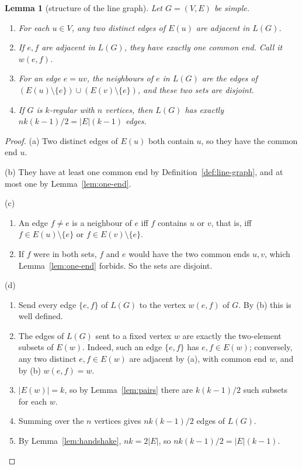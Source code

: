 \documentclass[11pt]{article}
\theoremstyle{plain}
\newtheorem{lemma}[theorem]{Lemma}
\theoremstyle{definition}
\theoremstyle{remark}
\newcommand{\LG}{L(G)}
\newcommand{\st}[1]{E(#1)}
\newenvironment{steps}{\begin{enumerate}[label=(\arabic*),leftmargin=2.2em,itemsep=0.35em]}{\end{enumerate}}
\begin{document}
\begin{lemma}[structure of the line graph]\label{lem:line-graph}
Let $G=(V,E)$ be simple.
\begin{enumerate}[label=(\alph*)]
  \item For each $u\in V$, any two distinct edges of $\st{u}$ are adjacent in $\LG$.
  \item If $e,f$ are adjacent in $\LG$, they have exactly one common end. Call it $w(e,f)$.
  \item For an edge $e=uv$, the neighbours of $e$ in $\LG$ are the edges of
    $(\st{u}\setminus\{e\})\cup(\st{v}\setminus\{e\})$, and these two sets are disjoint.
  \item If $G$ is $k$-regular with $n$ vertices, then $\LG$ has exactly $nk(k-1)/2=|E|(k-1)$
    edges.
\end{enumerate}
\end{lemma}

\begin{proof}
(a) Two distinct edges of $\st{u}$ both contain $u$, so they have the common end $u$.

(b) They have at least one common end by Definition~\ref{def:line-graph}, and at most one by
Lemma~\ref{lem:one-end}.

(c) \begin{steps}
  \item An edge $f\ne e$ is a neighbour of $e$ iff $f$ contains $u$ or $v$, that is, iff
    $f\in\st{u}\setminus\{e\}$ or $f\in\st{v}\setminus\{e\}$.
  \item If $f$ were in both sets, $f$ and $e$ would have the two common ends $u,v$, which
    Lemma~\ref{lem:one-end} forbids. So the sets are disjoint.
\end{steps}

(d) \begin{steps}
  \item Send every edge $\{e,f\}$ of $\LG$ to the vertex $w(e,f)$ of $G$. By (b) this is
    well defined.
  \item The edges of $\LG$ sent to a fixed vertex $w$ are exactly the two-element subsets of
    $\st{w}$. Indeed, such an edge $\{e,f\}$ has $e,f\in\st{w}$; conversely, any two distinct
    $e,f\in\st{w}$ are adjacent by (a), with common end $w$, and by (b) $w(e,f)=w$.
  \item $|\st{w}|=k$, so by Lemma~\ref{lem:pairs} there are $k(k-1)/2$ such subsets for each $w$.
  \item Summing over the $n$ vertices gives $nk(k-1)/2$ edges of $\LG$.
  \item By Lemma~\ref{lem:handshake}, $nk=2|E|$, so $nk(k-1)/2=|E|(k-1)$. \qedhere
\end{steps}
\end{proof}
\end{document}
